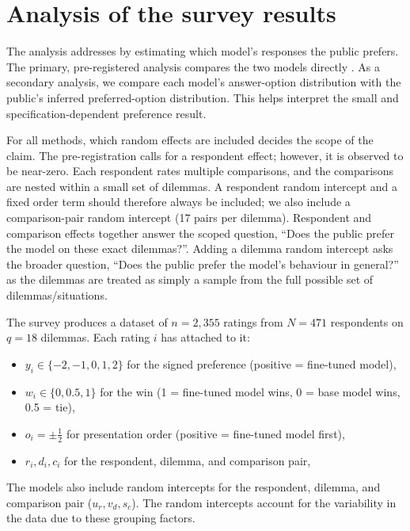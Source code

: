 \section{Analysis of the survey results}
\label{sec:survey-analysis}

The analysis addresses  by estimating which model's responses the public prefers. The primary, pre-registered analysis compares the two models directly \cite{thompsonPreregistrationAligningLLMs2026/10/1515:17}. As a secondary analysis, we compare each model's answer-option distribution with the public's inferred preferred-option distribution. This helps interpret the small and specification-dependent preference result.

For all methods, which random effects are included decides the scope of the claim. The pre-registration calls for a respondent effect; however, it is observed to be near-zero. Each respondent rates multiple comparisons, and the comparisons are nested within a small set of dilemmas. A respondent random intercept and a fixed order term should therefore always be included; we also include a comparison-pair random intercept (17 pairs per dilemma). Respondent and comparison effects together answer the scoped question, ``Does the public prefer the model on these exact dilemmas?''. Adding a dilemma random intercept asks the broader question, ``Does the public prefer the model's behaviour in general?'' as the dilemmas are treated as simply a sample from the full possible set of dilemmas/situations.

The survey produces a dataset of $n=2{,}355$ ratings from $N=471$ respondents on $q=18$ dilemmas. Each rating $i$ has attached to it:

\begin{itemize}
    \item $y_i \in \{-2,-1,0,1,2\}$ for the signed preference (positive = fine-tuned model),
    \item $w_i \in \{0, 0.5, 1\}$ for the win (1 = fine-tuned model wins, 0 = base model wins, 0.5 = tie),
    \item $o_i = \pm\tfrac12$ for presentation order (positive = fine-tuned model first),
    \item $r_i, d_i, c_i$ for the respondent, dilemma, and comparison pair,
\end{itemize}

The models also include random intercepts for the respondent, dilemma, and comparison pair ($u_r, v_d, s_c$). The random intercepts account for the variability in the data due to these grouping factors.

